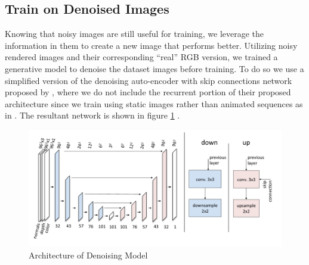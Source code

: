 \subsection{Train on Denoised Images} \label{denoising}
Knowing that noisy images are still useful for training, we leverage the information in them to create a new image that performs better. Utilizing noisy rendered images and their corresponding ``real'' RGB version, we trained a generative model to denoise the dataset images before training. To do so we use a simplified version of the denoising auto-encoder with skip connections network proposed by \cite{Chaitanya:2017:IRM:3072959.3073601}, where we do not include the recurrent portion of their proposed architecture since we train using static images rather than animated sequences as in \cite{Chaitanya:2017:IRM:3072959.3073601}. The resultant network is shown in figure \ref{fig:denoise} . 
\begin{figure}[h!]
\centering
\includegraphics[width=1.0\columnwidth]{./assets/denoiser_diagram.pdf}
\caption{Architecture of Denoising Model}
\label{fig:denoise}
\end{figure}

